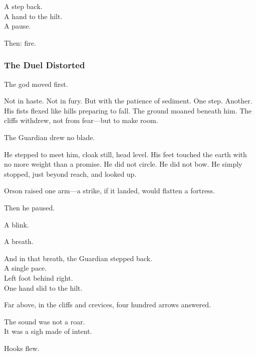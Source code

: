 \documentclass[12pt]{article}
\begin{document}
\vspace{0.5em}
A step back.\\
A hand to the hilt.\\
A pause.

\vspace{0.5em}
Then: fire.


\dotfill

\subsubsection*{The Duel Distorted}

The god moved first.

\vspace{0.5em}
Not in haste. Not in fury. But with the patience of sediment. One step. Another. His fists flexed like hills preparing to fall. The ground moaned beneath him. The cliffs withdrew, not from fear---but to make room.

\vspace{0.5em}
The Guardian drew no blade.

\vspace{0.5em}
He stepped to meet him, cloak still, head level. His feet touched the earth with no more weight than a promise. He did not circle. He did not bow. He simply stopped, just beyond reach, and looked up.

\vspace{0.5em}
Orson raised one arm---a strike, if it landed, would flatten a fortress.

\vspace{0.5em}
Then he paused.

\vspace{0.5em}
A blink.

\vspace{0.5em}
A breath.

\vspace{0.5em}
And in that breath, the Guardian stepped back.\\
A single pace.\\
Left foot behind right.\\
One hand slid to the hilt.

\vspace{0.5em}
Far above, in the cliffs and crevices, four hundred arrows answered.

\vspace{0.5em}
The sound was not a roar.\\
It was a sigh made of intent.

\vspace{0.5em}
Hooks flew.
\end{document}
